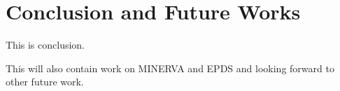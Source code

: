 \chapter{Conclusion and Future Works}\label{chap:conclusion}

This is conclusion.

This will also contain work on MINERVA and EPDS and looking forward to
other future work.
